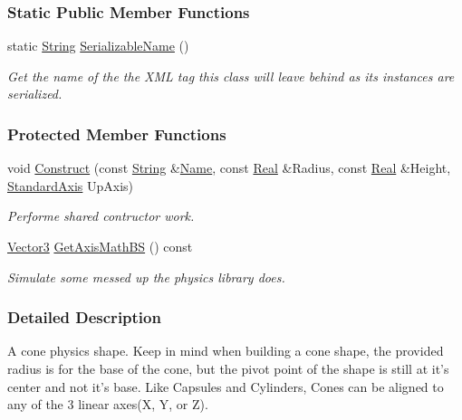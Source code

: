 \subsubsection*{Static Public Member Functions}
\begin{DoxyCompactItemize}
\item 
static \hyperlink{namespaceMezzanine_acf9fcc130e6ebf08e3d8491aebcf1c86}{String} \hyperlink{classMezzanine_1_1ConeCollisionShape_a41c55ca94878cb62836540b871457d77}{SerializableName} ()
\begin{DoxyCompactList}\small\item\em Get the name of the the XML tag this class will leave behind as its instances are serialized. \item\end{DoxyCompactList}\end{DoxyCompactItemize}
\subsubsection*{Protected Member Functions}
\begin{DoxyCompactItemize}
\item 
void \hyperlink{classMezzanine_1_1ConeCollisionShape_a5a29f404442602af52499c684c792310}{Construct} (const \hyperlink{namespaceMezzanine_acf9fcc130e6ebf08e3d8491aebcf1c86}{String} \&\hyperlink{classMezzanine_1_1CollisionShape_aac524c5c56fa4d158bc071f8aecfbe79}{Name}, const \hyperlink{namespaceMezzanine_a726731b1a7df72bf3583e4a97282c6f6}{Real} \&Radius, const \hyperlink{namespaceMezzanine_a726731b1a7df72bf3583e4a97282c6f6}{Real} \&Height, \hyperlink{namespaceMezzanine_ab41a00a8c6a47b576dc987ec34e16ba1}{StandardAxis} UpAxis)
\begin{DoxyCompactList}\small\item\em Performe shared contructor work. \item\end{DoxyCompactList}\item 
\hyperlink{classMezzanine_1_1Vector3}{Vector3} \hyperlink{classMezzanine_1_1ConeCollisionShape_aa4a1f1f839c3b6761b27b129b60c8e89}{GetAxisMathBS} () const 
\begin{DoxyCompactList}\small\item\em Simulate some messed up the physics library does. \item\end{DoxyCompactList}\end{DoxyCompactItemize}


\subsubsection{Detailed Description}
A cone physics shape. Keep in mind when building a cone shape, the provided radius is for the base of the cone, but the pivot point of the shape is still at it's center and not it's base. Like Capsules and Cylinders, Cones can be aligned to any of the 3 linear axes(X, Y, or Z). 


